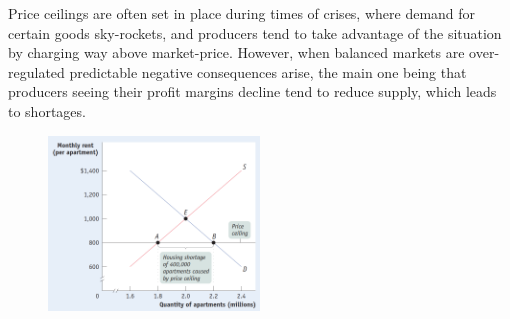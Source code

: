 \documentclass[english,course,draft]{Notes}
\begin{document}
\par{Price ceilings are often set in place during times of crises, where demand for certain goods sky-rockets, and producers tend to take advantage of the situation by charging way above market-price. However, when balanced markets are over-regulated predictable negative consequences arise, the main one being that producers seeing their profit margins decline tend to reduce supply, which leads to shortages. }


\begin{figure}[ht]
\centering
\includegraphics[height=0.3\textwidth, width=0.5\textwidth]{ceilling}
\end{figure}
\end{document}

